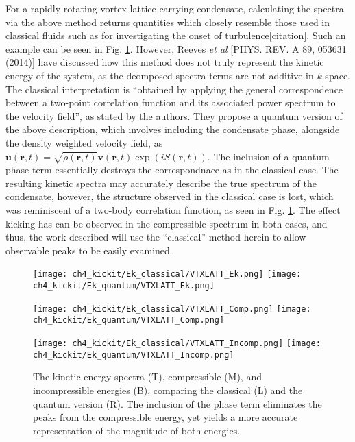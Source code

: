 For a rapidly rotating vortex lattice carrying condensate, calculating the spectra via the above method returns quantities which closely resemble those used in classical fluids such as for investigating the onset of turbulence[citation]. Such an example can be seen in Fig. \ref{fig:ek_clvqu}. However, Reeves {\it et al} [PHYS. REV. A 89, 053631 (2014)] have discussed how this method does not truly represent the kinetic energy of the system, as the deomposed spectra terms are not additive in $k$-space. The classical interpretation is ``obtained by applying the general correspondence between a two-point correlation function and its associated
power spectrum to the velocity field'', as stated by the authors. They propose a quantum version of the above description, which involves including the condensate phase, alongside the density weighted velocity field, as $\mathbf{u}(\mathbf{r},t) = \sqrt{\rho(\mathbf{r},t)}\mathbf{v}(\mathbf{r},t)\exp\left(iS(\mathbf{r},t)\right)$. The inclusion of a quantum phase term essentially destroys the correspondnace as in the classical case. The resulting kinetic spectra may accurately describe the true spectrum of the condensate, however, the structure observed in the classical case is lost, which was reminiscent of a two-body correlation function, as seen in Fig. \ref{fig:ek_clvqu}. The effect kicking has can be observed in the compressible spectrum in both cases, and thus, the work described will use the ``classical'' method herein to allow observable peaks to be easily examined.

\begin{figure}
    \centering
    \texttt{[image: ch4\_kickit/Ek\_classical/VTXLATT\_Ek.png]}
    \texttt{[image: ch4\_kickit/Ek\_quantum/VTXLATT\_Ek.png]}

    \texttt{[image: ch4\_kickit/Ek\_classical/VTXLATT\_Comp.png]}
    \texttt{[image: ch4\_kickit/Ek\_quantum/VTXLATT\_Comp.png]}

    \texttt{[image: ch4\_kickit/Ek\_classical/VTXLATT\_Incomp.png]}
    \texttt{[image: ch4\_kickit/Ek\_quantum/VTXLATT\_Incomp.png]}

\caption{The kinetic energy spectra (T), compressible (M), and incompressible energies (B), comparing the classical (L) and the quantum version (R). The inclusion of the phase term eliminates the peaks from the compressible energy, yet yields a more accurate representation of the magnitude of both energies.}
\label{fig:ek_clvqu}
\end{figure}


